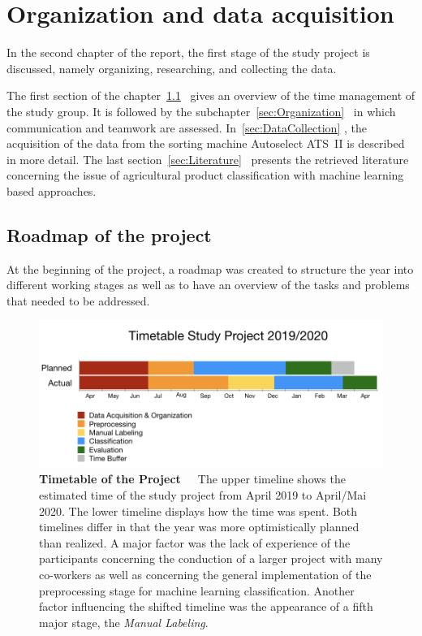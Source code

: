 
\section{Organization and data acquisition}
\label{ch:DataAcquisition}

In the second chapter of the report, the first stage of the study project is discussed, namely organizing, researching, and collecting the data.

The first section of the chapter~\ref{sec:Roadmap}~ gives an overview of the time management of the study group. It is followed by the subchapter~\ref{sec:Organization}~ in which communication and teamwork are assessed. In~\ref{sec:DataCollection} , the acquisition of the data from the sorting machine Autoselect ATS~II is described in more detail. The last section~\ref{sec:Literature}~ presents the retrieved literature concerning the issue of agricultural product classification with machine learning based approaches.

\subsection{Roadmap of the project}
\label{sec:Roadmap}

At the beginning of the project, a roadmap was created to structure the year into different working stages as well as to have an overview of the tasks and problems that needed to be addressed.

\begin{figure}[h]
	\centering
	\includegraphics[scale=0.43]{Figures/chapter02/new_timetable.png}
	\decoRule
	\caption[Timetable of the Project]{\textbf{Timetable of the Project}~~~The upper timeline shows the estimated time of the study project from April 2019 to April/Mai 2020. The lower timeline displays how the time was spent. Both timelines differ in that the year was more optimistically planned than realized. A major factor was the lack of experience of the participants concerning the conduction of a larger project with many co-workers as well as concerning the general implementation of the preprocessing stage for machine learning classification. Another factor influencing the shifted timeline was the appearance of a fifth major stage, the \emph{Manual Labeling}.}
	\label{fig:Timetable}
\end{figure}


